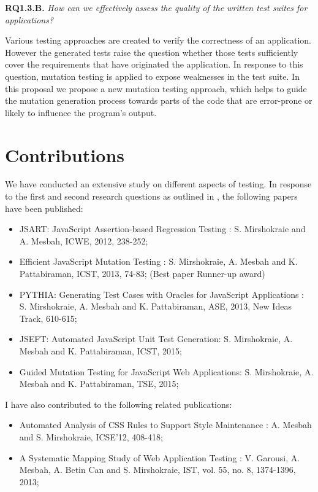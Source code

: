 {\bf RQ1.3.B.} \emph{How can we effectively assess the quality of the written test suites for \javascript applications?}

Various testing approaches are created to verify the correctness of an application. However the generated tests raise the question whether those tests sufficiently cover the requirements that have originated the application.  In response to this question, mutation testing is applied to expose weaknesses in the test suite.
In this proposal we propose a new \javascript mutation testing approach, which helps to guide the
mutation generation process towards parts of the code that are error-prone or likely to influence the program's
output.

\section{Contributions} \label{Sec:contrib}
We have conducted an
extensive study on different aspects of \javascript testing. In response to the first and second research questions as outlined in , the following papers have been published:
\begin{itemize} [noitemsep, nolistsep]
\item JSART: JavaScript Assertion-based Regression Testing \cite{mirshokraie:icwe12}:
S. Mirshokraie and A. Mesbah, ICWE, 2012, 238-252;
\item Efficient JavaScript Mutation Testing \cite{mirshokraie:icst13}:
S. Mirshokraie, A. Mesbah and K. Pattabiraman, ICST, 2013, 74-83; (Best paper Runner-up award)
\item PYTHIA: Generating Test Cases with Oracles
for JavaScript Applications \cite{shabnam:ase13}: 
S. Mirshokraie, A. Mesbah and K. Pattabiraman, ASE, 2013, New Ideas Track, 610-615;
\item JSEFT: Automated JavaScript Unit Test Generation:
S. Mirshokraie, A. Mesbah and K. Pattabiraman, ICST, 2015;
\item Guided Mutation Testing for JavaScript Web Applications:
S. Mirshokraie, A. Mesbah and K. Pattabiraman, TSE, 2015;
\end{itemize}

I have also contributed to the following related publications:
\begin{itemize} [noitemsep, nolistsep]
\item Automated Analysis of CSS Rules to Support Style Maintenance \cite{mesbah:icse12}: 
A. Mesbah and S. Mirshokraie, ICSE'12, 408-418;
\item A Systematic Mapping Study of Web Application Testing \cite{garousi:ist13}: 
V. Garousi, A. Mesbah, A. Betin Can and S. Mirshokraie, IST, vol. 55, no. 8, 1374-1396, 2013;
\end{itemize}
